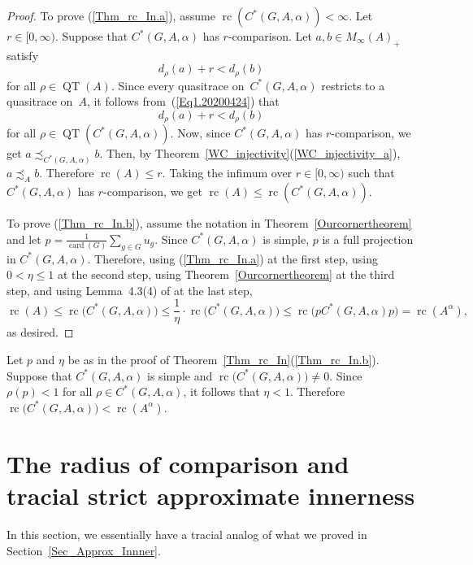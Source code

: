 \documentclass[10pt]{amsart}
\numberwithin{equation}{section}
\theoremstyle{definition}
\newcommand{\af}{\alpha}
\newcommand{\card}{{\operatorname{card}}}
\newcommand{\QT}{{\operatorname{QT}}}
\newcommand{\rc}{{\operatorname{rc}}}
\newcommand{\CGAa}{C^* (G, A, \af)}
\newcommand{\I}{\infty}
\newcommand{\Thm}[1]{Theorem~\ref{#1}}
\begin{document}
\begin{proof}
To prove (\ref{Thm_rc_In.a}), assume $\rc (\CGAa) < \infty$.
Let $r \in [0, \I)$. Suppose that $\CGAa$ has $r$-comparison.
Let $a, b \in M_{\I} (A)_{+}$
satisfy 
\begin{equation}\label{Eq1.20200424}
d_{\rho} (a) + r < d_{\rho} (b)
\end{equation}
for all $\rho \in \QT (A)$.
Since every quasitrace on~$\CGAa$ restricts to a quasitrace on~$A$,
it follows from~(\ref{Eq1.20200424}) that 
\[
d_{\rho} (a) + r < d_{\rho} (b)
\]
for all $\rho \in \QT (\CGAa)$.
Now, since $\CGAa$ has $r$-comparison, we get $a \precsim_{\CGAa} b$.
Then, by \Thm{WC_injectivity}(\ref{WC_injectivity_a}), $a \precsim_{A} b$.
Therefore $\rc (A) \leq r$.
Taking the infimum over $r \in [0, \I)$
such that $\CGAa$ has $r$-comparison,
we get $\rc (A) \leq \rc (\CGAa)$.

To prove (\ref{Thm_rc_In.b}), assume the notation in Theorem~\ref{Ourcornertheorem} and let $p = \frac{1}{\card (G)} \sum_{g \in G} u_g$. 
Since $C^*(G, A, \alpha)$ is simple, $p$ is a  full projection in $C^*(G, A, \alpha)$.
Therefore, using (\ref{Thm_rc_In.a}) at the first step, 
using $0<\eta \leq 1$ at the second step, 
using Theorem~\ref{Ourcornertheorem} at the third step, 
and using Lemma~4.3(4) of \cite{AGP19} at the last step,
\[
\rc (A) \leq \rc \big(C^*(G, A, \alpha)\big) \leq \frac{1}{\eta} \cdot \rc \big(C^*(G, A, \alpha)\big) \leq 
\rc \big( p C^*(G, A, \alpha) p \big)  = \rc (A^\alpha),
\]
as desired.
\end{proof}
Let $p$ and $\eta$ be as in the proof of Theorem~\ref{Thm_rc_In}(\ref{Thm_rc_In.b}).
Suppose that 
$C^*(G, A, \alpha)$ is simple and
$\rc \big(C^*(G, A, \alpha)\big)\neq 0$. Since $\rho (p) <1$ for all $\rho \in C^*(G, A, \alpha)$, 
it follows that $\eta<1$. Therefore
$\rc \big(C^*(G, A, \alpha) \big) < \rc (A^{\alpha})$.  
\section{The radius of comparison and tracial strict approximate innerness}
\label{Sec_Tracial_Approx_Innner}
In this section, we essentially have a tracial analog of what we proved in Section~\ref{Sec_Approx_Innner}. 
\end{document}
